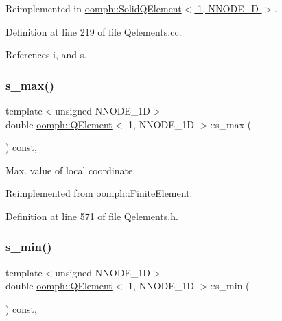 Reimplemented in \hyperlink{classoomph_1_1SolidQElement_3_011_00_01NNODE__1D_01_4_aee559383965b0581c287e10d6278050e}{oomph\+::\+Solid\+Q\+Element$<$ 1, N\+N\+O\+D\+E\+\_\+D $>$}.



Definition at line 219 of file Qelements.\+cc.



References i, and s.

\mbox{\label{classoomph_1_1QElement_3_011_00_01NNODE__1D_01_4_af391160512c8202d14800208b482e5d6}} 
\subsubsection{\texorpdfstring{s\+\_\+max()}{s\_max()}}
{\footnotesize\ttfamily template$<$unsigned N\+N\+O\+D\+E\+\_\+1D$>$ \\
double \hyperlink{classoomph_1_1QElement}{oomph\+::\+Q\+Element}$<$ 1, N\+N\+O\+D\+E\+\_\+1D $>$\+::s\+\_\+max (\begin{DoxyParamCaption}{ }\end{DoxyParamCaption}) const\hspace{0.3cm}{\ttfamily [inline]}, {\ttfamily [virtual]}}



Max. value of local coordinate. 



Reimplemented from \hyperlink{classoomph_1_1FiniteElement_a64adbe9356927133686ab53f00341ea8}{oomph\+::\+Finite\+Element}.



Definition at line 571 of file Qelements.\+h.

\mbox{\label{classoomph_1_1QElement_3_011_00_01NNODE__1D_01_4_a9fe7074b59a681c7face3f20349eb128}} 
\subsubsection{\texorpdfstring{s\+\_\+min()}{s\_min()}}
{\footnotesize\ttfamily template$<$unsigned N\+N\+O\+D\+E\+\_\+1D$>$ \\
double \hyperlink{classoomph_1_1QElement}{oomph\+::\+Q\+Element}$<$ 1, N\+N\+O\+D\+E\+\_\+1D $>$\+::s\+\_\+min (\begin{DoxyParamCaption}{ }\end{DoxyParamCaption}) const\hspace{0.3cm}{\ttfamily [inline]}, {\ttfamily [virtual]}}




